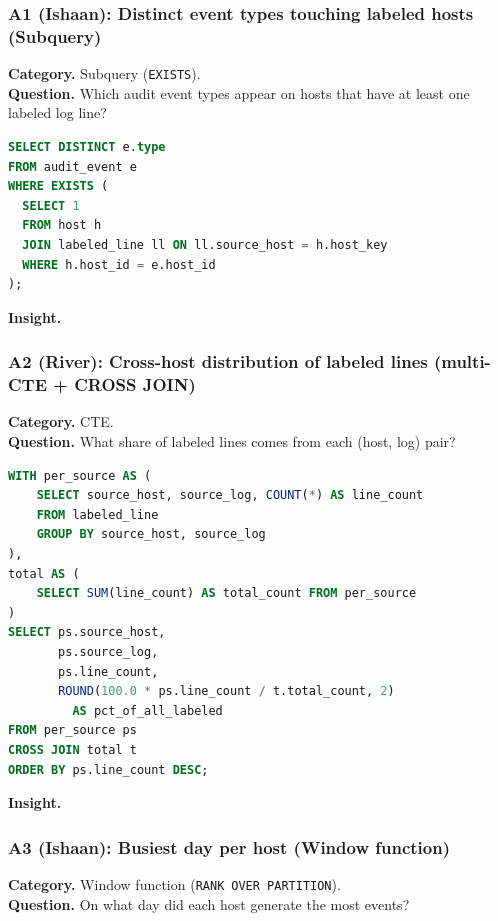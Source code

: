 \subsubsection{A1 (Ishaan): Distinct event types touching labeled hosts (Subquery)}
\textbf{Category.} Subquery (\texttt{EXISTS}).\\
\textbf{Question.} Which audit event types appear on hosts that have at
least one labeled log line?
\begin{lstlisting}[language=SQL]
SELECT DISTINCT e.type
FROM audit_event e
WHERE EXISTS (
  SELECT 1
  FROM host h
  JOIN labeled_line ll ON ll.source_host = h.host_key
  WHERE h.host_id = e.host_id
);
\end{lstlisting}
\textbf{Insight.} %

\subsubsection{A2 (River): Cross-host distribution of labeled lines (multi-CTE + CROSS JOIN)}
\textbf{Category.} CTE.\\
\textbf{Question.} What share of labeled lines comes from each
(host, log) pair?

\begin{lstlisting}[language=SQL]
WITH per_source AS (
    SELECT source_host, source_log, COUNT(*) AS line_count
    FROM labeled_line
    GROUP BY source_host, source_log
),
total AS (
    SELECT SUM(line_count) AS total_count FROM per_source
)
SELECT ps.source_host,
       ps.source_log,
       ps.line_count,
       ROUND(100.0 * ps.line_count / t.total_count, 2)
         AS pct_of_all_labeled
FROM per_source ps
CROSS JOIN total t
ORDER BY ps.line_count DESC;
\end{lstlisting}
\textbf{Insight.} %

\subsubsection{A3 (Ishaan): Busiest day per host (Window function)}
\textbf{Category.} Window function (\texttt{RANK}~\texttt{OVER PARTITION}).\\
\textbf{Question.} On what day did each host generate the most events?

